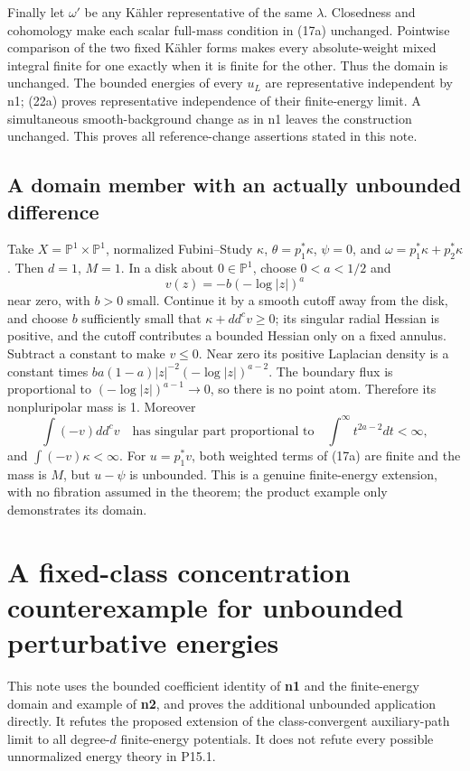 \documentclass[
  11pt,
]{article}
\begin{document}
Finally let \(\omega'\) be any Kähler representative of the same
\(\lambda\). Closedness and cohomology make each scalar full-mass
condition in (17a) unchanged. Pointwise comparison of the two fixed
Kähler forms makes every absolute-weight mixed integral finite for one
exactly when it is finite for the other. Thus the domain is unchanged.
The bounded energies of every \(u_L\) are representative independent by
n1; (22a) proves representative independence of their finite-energy
limit. A simultaneous smooth-background change as in n1 leaves the
construction unchanged. This proves all reference-change assertions
stated in this note.

\subsection{A domain member with an actually unbounded
difference}\label{a-domain-member-with-an-actually-unbounded-difference}

Take \(X=\mathbb P^1\times\mathbb P^1\), normalized Fubini--Study
\(\kappa\), \(\theta=p_1^*\kappa\), \(\psi=0\), and
\(\omega=p_1^*\kappa+p_2^*\kappa\). Then \(d=1\), \(M=1\). In a disk
about \(0\in\mathbb P^1\), choose \(0<a<1/2\) and \[
v(z)=-b(-\log|z|)^a
\] near zero, with \(b>0\) small. Continue it by a smooth cutoff away
from the disk, and choose \(b\) sufficiently small that
\(\kappa+dd^cv\geq0\); its singular radial Hessian is positive, and the
cutoff contributes a bounded Hessian only on a fixed annulus. Subtract a
constant to make \(v\leq0\). Near zero its positive Laplacian density is
a constant times \(b a(1-a)|z|^{-2}(-\log|z|)^{a-2}\). The boundary flux
is proportional to \((-\log|z|)^{a-1}\to0\), so there is no point atom.
Therefore its nonpluripolar mass is 1. Moreover \[
\int(-v)dd^cv\quad\text{has singular part proportional to}
\quad\int^{\infty}t^{2a-2}dt<\infty,
\] and \(\int(-v)\kappa<\infty\). For \(u=p_1^*v\), both weighted terms
of (17a) are finite and the mass is \(M\), but \(u-\psi\) is unbounded.
This is a genuine finite-energy extension, with no fibration assumed in
the theorem; the product example only demonstrates its domain.

\section{A fixed-class concentration counterexample for unbounded
perturbative
energies}\label{a-fixed-class-concentration-counterexample-for-unbounded-perturbative-energies}

This note uses the bounded coefficient identity of \textbf{n1} and the
finite-energy domain and example of \textbf{n2}, and proves the
additional unbounded application directly. It refutes the proposed
extension of the class-convergent auxiliary-path limit to all
degree-\(d\) finite-energy potentials. It does not refute every possible
unnormalized energy theory in P15.1.
\end{document}
